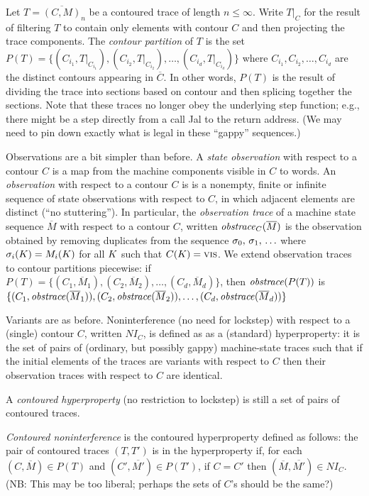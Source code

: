 \documentclass[conference]{IEEEtran}
\begin{document}
  Let $T = \overline{(C,M)}_n$ be a contoured trace of length $n \leq \infty$.
  Write $T\vert_C$ for the result of
  filtering $T$ to contain only elements with contour $C$ and 
  then projecting the trace components.
  The \emph{contour partition} of $T$ is the set
  $P(T) = \{(C_{i_1},T\vert_{C_{i_1}}),
  (C_{i_2},T\vert_{C_{i_2}}),
  \ldots,(C_{i_d},T\vert_{C_{i_d}})\}$ where
  $C_{i_1},C_{i_2},\ldots,C_{i_d}$ are the distinct contours appearing in $\overline{C}$.
  In other words, $P(T)$ is the result of dividing the trace into sections based on contour and then splicing together the sections. Note that these traces no longer obey the underlying step function; e.g., there might be a step directly from a call Jal to the return address. (We may need to pin down exactly what is legal in these ``gappy'' sequences.)

  Observations are a bit simpler than before. 
  A \emph{state observation} with respect to a contour $C$ is a map from
  the machine components visible in $C$ to words.
  An \emph{observation} with respect to a contour $C$ is 
  is a nonempty, finite or infinite sequence of
  state observations with respect to $C$, in which adjacent elements
  are distinct (``no stuttering''). 
  In particular, the \emph{observation trace} of
  a machine state sequence $\overline{M}$ with respect to a contour $C$,
  written $\mathit{obstrace}_C(\overline{M})$ is the observation 
  obtained by removing duplicates from the sequence 
  $\sigma_0,\, \sigma_1,\, \ldots$ where
  $\sigma_i(K) = M_i(K)$ for all $K$ such that $C(K) = \textsc{vis}$.
  We extend observation traces to contour partitions piecewise:
  if $P(T) = \{(C_1,\overline{M}_1),(C_2,\overline{M}_2),\ldots,(C_d,\overline{M}_d)\}$, then $\mathit{obstrace}(P(T))$ is $\{(C_1,\mathit{obstrace}(\overline{M}_1)),
  (C_2,\mathit{obstrace}(\overline{M}_2)),\ldots,(C_d,\mathit{obstrace}(\overline{M}_d))\}$


  Variants are as before.
  Noninterference (no need for lockstep) with respect to a (single)
  contour $C$, written $NI_C$, is defined as as a (standard) hyperproperty: it is the set of pairs of (ordinary, but possibly gappy) machine-state traces such that if the initial elements of the traces are variants with respect to $C$ then their observation traces with respect to $C$ are identical.

  A \emph{contoured hyperproperty} (no restriction to lockstep) is still a set of pairs of contoured traces. 

  \emph{Contoured noninterference} is the contoured hyperproperty defined as follows: the pair of contoured traces $(T,T')$ is in the hyperproperty if,
  for each $(C,\overline{M}) \in P(T)$ and $(C',\overline{M'}  ) \in P(T')$,
  if $C = C'$ then $(\overline{M},\overline{M'}) \in NI_{C}$. (NB: This may
  be too liberal; perhaps the sets of $C$'s should be the same?)
  
\end{document}
